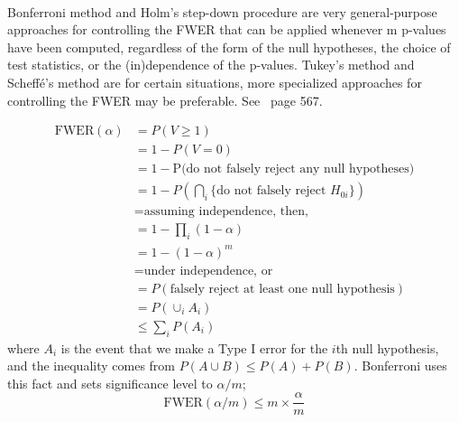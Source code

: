 \vspace{.2in}
\\
Bonferroni method and Holm’s step-down procedure are very general-purpose 
approaches for controlling the FWER that can be applied whenever m p-values have been computed, regardless of the form of the null hypotheses, the choice of test statistics, or the
(in)dependence of the p-values. Tukey’s method and Scheff{\'e}'s method are for 
certain situations, more specialized approaches for controlling the FWER may be
preferable. See~\citep{james2013introduction} page 567.

\begin{align*}
\text{FWER}(\alpha) &= P(V \ge 1)\\
                     &= 1- P(V =0)\\
                     &= 1- \text{P(do not falsely reject any null hypotheses)}\\
                     &= 1 - P(\bigcap_i \text{\{do not falsely reject } H_{0i}  \text{\}})\\
                     &= \text{assuming independence, then,}\\
                     &= 1 - \prod_i (1 - \alpha)\\
                     &= 1 - (1 - \alpha)^m\\
                     &= \text{under independence, or}\\
                     &= P(\text{falsely reject at least one null hypothesis})\\
                     &= P(\cup_i A_i)\\
                     &\le \sum_i P(A_i)
\end{align*}
where $A_i$ is the event that we make a Type I error for the $i$th null hypothesis,
and the inequality comes from $P(A \cup B) \le P(A) + P(B)$.
Bonferroni uses this fact and sets significance level to $\alpha/m$;
\[\text{FWER}(\alpha/m) \le  m \times \frac{\alpha}{m} \]


  